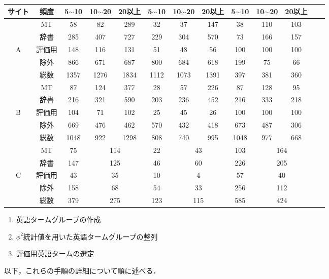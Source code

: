 \begin{table*}
\begin{center}
{\begin{tabular}{|c|c||c|c|c||c|c|c||c|c|c|c|c|}
サイト &   頻度  & 5$\sim$10  & 10$\sim$20 & 20以上 &
   5$\sim$10  & 10$\sim$20 & 20以上 & 5$\sim$10  & 10$\sim$20 & 20以上 \\ \hline\hline
&    MT  & 58 & 82 & 289 & 32 &37 & 147 
    & 38 & 110 & 103 \\ \cline{2-11}
&    辞書  & 285 & 407 & 727 & 229
   & 304 & 570 
   & 73 & 166 & 157 \\ \cline{2-11}
A &  評価用  & 148  &  116  & 131 &51 & 48 &56
  & 100 & 100  & 100  \\ \cline{2-11}
& 除外  & 866 & 671 & 687& 800 &
   684 & 618
 & 199 & 75 & 66  \\ \cline{2-11} 
&   総数 & 1357 & 1276 & 1834 & 1112 &
   1073 & 1391
   & 397 & 381 & 360 \\ \hline\hline
   & MT  & 87 & 124& 377 & 28 & 57& 226 
    & 87 & 128 & 95 \\ \cline{2-11}
&  辞書  & 216 & 321 & 590 & 203
   & 236 & 452 
   & 216 & 333 & 218 \\ \cline{2-11}
B &   評価用  & 104  &  71  & 102 &25 & 45 &26
  & 100 & 100 &  100 \\ \cline{2-11}
&    除外  & 669 &  476  & 462 & 570 &
   432 & 418
 & 673 & 487  & 306  \\ \cline{2-11} 
&   総数 & 1048 &  922 & 1298 &  808 &
   740  &  995
   & 1048 & 977 & 668 \\ \hline
   & MT  & 75 & \multicolumn{2}{|c||}{114} & 22 & \multicolumn{2}{|c||}{43} 
    & 103 & \multicolumn{2}{|c|}{164} \\ \cline{2-11}
&   辞書  & 147 & \multicolumn{2}{|c||}{125} &  46
   &  \multicolumn{2}{|c||}{60} 
   & 226 & \multicolumn{2}{|c|}{205}  \\ \cline{2-11}
C &  評価用  &  43  &  \multicolumn{2}{|c||}{35}
   & 10 &  \multicolumn{2}{|c||}{4}
    & 57 & \multicolumn{2}{|c|}{40}
   \\ \cline{2-11}
& 除外   & 158 &
   \multicolumn{2}{|c||}{68}  
     & 54&  \multicolumn{2}{|c||}{33} & 256 & \multicolumn{2}{|c|}{112}
 \\ \cline{2-11} 
& 総数    &  379 &
   \multicolumn{2}{|c||}{275}
    &123& \multicolumn{2}{|c||}{115} & 585 & \multicolumn{2}{|c|}{424}
 \\ \hline
  \end{tabular}

}


\end{center}
\end{table*}

\begin{enumerate}
\item 英語タームグループの作成
\item $\phi^2$統計値を用いた英語タームグループの整列
\item 評価用英語タームの選定
\end{enumerate}
以下，これらの手順の詳細について順に述べる．

